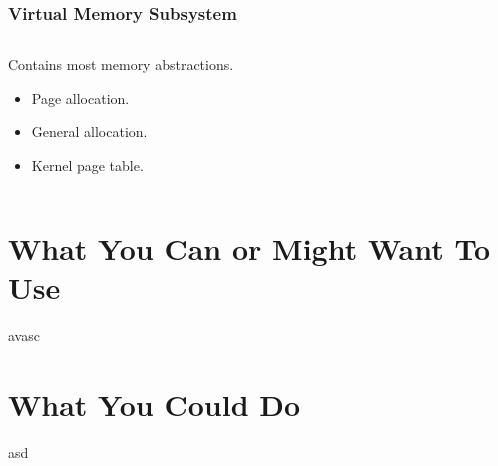 \documentclass{beamer}
\begin{document}
\begin{frame}
  \frametitle{Virtual Memory Subsystem}
  \begin{columns}
    \begin{column}{0.5\textwidth}
      Contains most memory abstractions.
      \begin{itemize}
      \item Page allocation.\\
      \item General allocation.\\
      \item Kernel page table.
      \end{itemize}
    \end{column}
    \begin{column}{0.5\textwidth}
    \end{column}
  \end{columns}
\end{frame}

\section{What You Can or Might Want To Use}

\begin{frame}
  avasc
\end{frame}

\section{What You Could Do}
\begin{frame}

asd
\end{frame}
\end{document}
